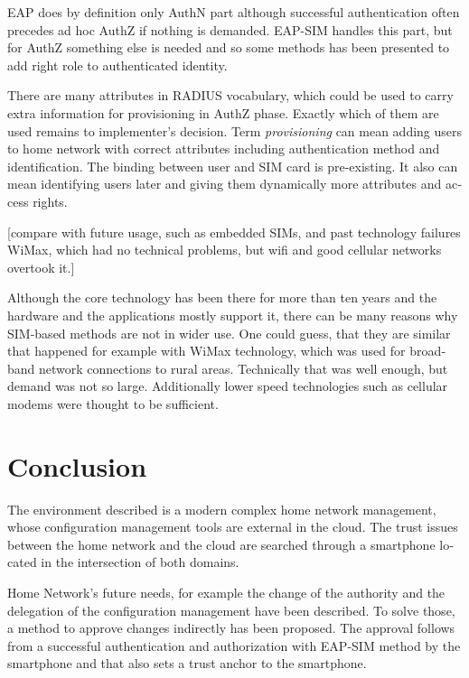 \documentclass[12pt,a4paper,english]{tutthesis}
\begin{document}
\begin{otherlanguage}{english}
EAP does by definition only AuthN part although successful
authentication often precedes ad hoc AuthZ if nothing is demanded.
EAP-SIM handles this part, but for AuthZ something else is needed
and so some methods has been presented to add right role to 
authenticated identity.

There are many attributes in RADIUS vocabulary, which could be 
used to carry extra information for provisioning in AuthZ phase. Exactly which
of them are used remains to implementer's  decision.
Term \emph{provisioning} can mean adding users to home network with correct
attributes including authentication method and identification.
The binding between user and SIM card is pre-existing.
It also can mean identifying users later and giving them 
dynamically more attributes and access rights.

[compare with future usage, such as embedded SIMs, and past technology 
failures WiMax, which had no technical problems, but wifi and good
cellular networks overtook it.]

Although the core technology has been there for more than ten years and
the hardware and the applications mostly support it, 
there can be many reasons why SIM-based methods are not in wider use. 
One could guess, that they are similar that happened for example with 
WiMax technology, which was used for broadband network connections to
rural areas. Technically that was well enough, but demand was not so
large. Additionally lower speed technologies such as cellular modems
were thought to be sufficient.


\chapter{Conclusion}
\label{sec-7}



The environment described is a modern complex home network management, whose configuration
management tools are external in the cloud. The trust issues between the
home network and the cloud are searched through a 
smartphone located in the intersection of both domains.

Home Network's future needs, for example  the change of the authority and the
delegation of the configuration management have been described. 
To solve those, a method to approve changes indirectly has been proposed. The approval
follows from a successful authentication and authorization with EAP-SIM
method by the smartphone and that also sets a trust anchor to the smartphone.



\end{otherlanguage}
\end{document}
